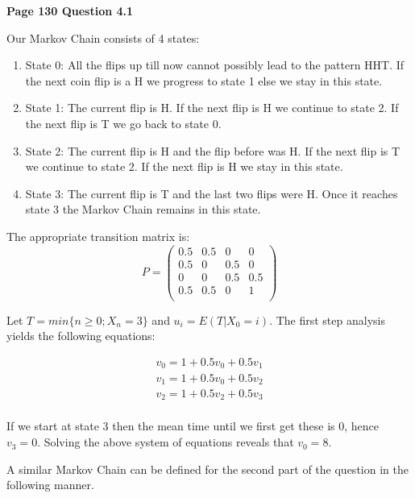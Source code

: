 \documentclass[10pt,a4paper]{article}
\begin{document}
\begin{flushleft}

\begin{eqnarray*}
\\
\end{eqnarray*}


\textbf{Page 130 Question 4.1}

Our Markov Chain consists of 4 states:
\begin{enumerate}
    \item State 0: All the flips up till now cannot possibly lead to the pattern
    HHT. If the next coin flip is a H we progress to state 1 else
    we stay in this state.
    \item State 1: The current flip is H. If the next flip is H we
    continue to state 2. If the next flip is T we go back to state
    0.
    \item State 2: The current flip is H and the flip before was
    H. If the next flip is T we continue to state 2. If the next flip
    is H we stay in this state.
    \item State 3: The current flip is T and the last two flips
    were H. Once it reaches state 3 the Markov Chain remains in this state.
\end{enumerate}
The appropriate transition matrix is:
\[ P = \left ( \begin{array}{cccc}
 0.5 & 0.5 & 0 & 0  \\
 0.5 & 0 & 0.5 & 0  \\
 0 & 0 & 0.5 & 0.5  \\
 0.5 & 0.5 & 0 & 1  \\
\end{array} \right) \]

Let $T=min\{n \geq 0 ; X_n=3\}$ and $u_i=E(T|X_0=i)$. The first
step analysis yields the following equations:

\begin{eqnarray*}
v_0=1+0.5v_0+0.5v_1 \\
v_1=1+0.5v_0+0.5v_2 \\
v_2=1+0.5v_2+0.5v_3 \\
\end{eqnarray*}

If we start at state 3 then the mean time until we first get these
is 0, hence $v_3=0$. Solving the above system of equations reveals
that $v_0=8$.


A similar Markov Chain can be defined for the second part of the
question in the following manner.


\end{flushleft}
\end{document}
